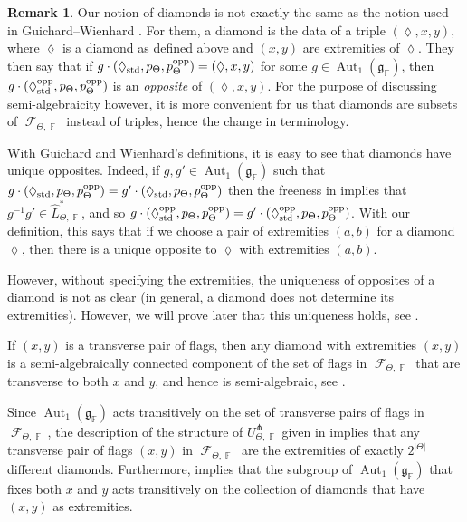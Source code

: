 \documentclass{amsart}
\theoremstyle{plain}
\theoremstyle{definition}
\newtheorem{remark}[proposition]{Remark}
\DeclareMathOperator{\Aut}{Aut}
\DeclareMathOperator{\Diam}{\lozenge}
\DeclareMathOperator{\Fc}{\mathcal{F}}
\DeclareMathOperator{\Fb}{{\mathbb{F}}}
\newcommand{\std}{\textnormal{std}}
\newcommand{\1}{\mathbf{1}}
\begin{document}
\begin{remark}\label{GW diamonds}
Our notion of diamonds is not exactly the same as the notion used in Guichard--Wienhard \cite{guichard2025generalizing}. For them, a diamond is the data of a triple $(\Diam,x,y)$, where $\Diam$ is a diamond as defined above and $(x,y)$ are extremities of $\Diam$. They then say that if $g \cdot (\Diam_{\std},p_{\Theta},p_{\Theta}^{\rm opp})=(\Diam,x,y)$ for some $g\in \Aut_1(\mathfrak g_{\Fb})$, then $g \cdot (\Diam_{\std}^{\rm opp},p_{\Theta},p_{\Theta}^{\rm opp})$ is an \emph{opposite} of $(\Diam,x,y)$. For the purpose of discussing semi-algebraicity however, it is more convenient for us that diamonds are subsets of $\Fc_{\Theta,\Fb}$ instead of triples, hence the change in terminology.

With Guichard and Wienhard's definitions, it is easy to see that diamonds have unique opposites. Indeed, if $g,g'\in \Aut_1(\mathfrak g_{\Fb})$ such that $g \cdot (\Diam_{\std},p_{\Theta},p_{\Theta}^{\rm opp})=g' \cdot (\Diam_{\std},p_{\Theta},p_{\Theta}^{\rm opp})$ then the freeness in  implies that $g^{-1}g'\in\hat L_{\Theta,\Fb}^*$, and so $g \cdot (\Diam_{\std}^{\rm opp},p_{\Theta},p_{\Theta}^{\rm opp})=g' \cdot (\Diam_{\std}^{\rm opp},p_{\Theta},p_{\Theta}^{\rm opp})$. With our definition, this says that if we choose a pair of extremities $(a,b)$ for a diamond $\Diam$, then there is a unique opposite to $\Diam$ with extremities $(a,b)$. 

However, without specifying the extremities, the uniqueness of opposites of a diamond is not as clear (in general, a diamond does not determine its extremities). However, we will prove later that this uniqueness holds, see .
\end{remark}

If $(x,y)$ is a transverse pair of flags, then any diamond with extremities $(x,y)$ is a semi-algebraically connected component of the set of flags in $\Fc_{\Theta,\Fb}$ that are transverse to both $x$ and $y$, and hence is semi-algebraic, see .

Since $\Aut_1(\mathfrak g_{\Fb})$ acts transitively on the set of transverse pairs of flags in $\Fc_{\Theta,\Fb}$, the description of the structure of $U_{\Theta,\Fb}^\pitchfork$ given in  implies that any transverse pair of flags $(x,y)$ in $\Fc_{\Theta,\Fb}$ are the extremities of exactly $2^{|\Theta|}$ different diamonds. Furthermore,  implies that the subgroup of $\Aut_1(\mathfrak g_{\Fb})$ that fixes both $x$ and $y$ acts transitively on the collection of diamonds that have $(x,y)$ as extremities.
\end{document}
